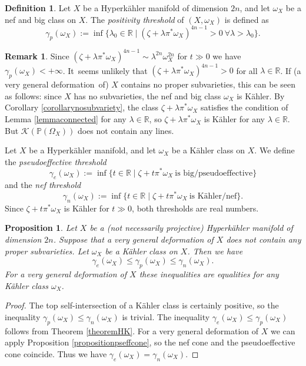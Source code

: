 \documentclass[11pt]{article}
\let\mathcal\mathscr
\theoremstyle{plain}
\newtheorem{proposition}[theorem]{Proposition}
\theoremstyle{definition}
\newtheorem{definition}[theorem]{Definition}
\newtheorem{remark}[theorem]{Remark}
\newcommand{\R}{\ensuremath{\mathbb{R}}}
\newcommand{\PP}{\ensuremath{\mathbb{P}}}
\begin{document}
\begin{definition}
Let $X$ be a Hyperkähler manifold of dimension $2n$, and
let $\omega_X$ be a nef and big class on $X$.
The \emph{positivity threshold} of $(X, \omega_X)$ is defined as
\[
\gamma_p(\omega_X):=\inf \{ \lambda_0 \in \R \mid (\zeta+ \lambda \pi^*\omega_X)^{4n-1}>0\ \forall \lambda > \lambda_0 \}.
\]
\end{definition}

\begin{remark}\label{solution}
Since $(\zeta+ \lambda\pi^*\omega_X)^{4n-1}\sim \lambda ^{2n}\omega_X^{2n}$ for $t \gg 0$
we have \hbox{$\gamma_p(\omega_X)<+\infty$}.
It~seems unlikely that $(\zeta+ \lambda \pi^*\omega_X)^{4n-1}>0$ for all $\lambda \in \R$. If
(a very general deformation~of) $X$ contains no proper subvarieties, this can be seen as follows:
since $X$ has no subvarieties, the nef and big class $\omega_X$ is Kähler.
By Corollary \ref{corollarynosubvariety}, the class $\zeta+ \lambda \pi^*\omega_X$ satisfies the condition
of Lemma \ref{lemmaconnected} for any $\lambda \in \R$, so $\zeta+ \lambda \pi^*\omega_X$ is Kähler
for any $\lambda \in \R$. But $\mathcal K(\PP(\Omega_X))$ does not contain any lines.
\end{remark}

Let $X$ be a Hyperkähler manifold, and let $\omega_X$ be a Kähler class on $X$.
We define the \emph{pseudoeffective threshold}
\[
\gamma_e(\omega_X):=\inf \{ t\in \R \mid \zeta+t\pi^*\omega_X \ \text{is big/pseudoeffective}\}
\]
and the \emph{nef threshold}
\[
\gamma_n(\omega_X):=\inf \{ t\in \R \mid \zeta+t\pi^*\omega_X \ \text{is Kähler/nef}\}.
\]
Since $\zeta+t\pi^*\omega_X$ is Kähler for $t \gg 0$, both thresholds are real numbers.

\begin{proposition}\label{threshold}
Let $X$ be a (not necessarily projective) Hyperkähler manifold of dimension $2n$.
Suppose that a very general deformation of $X$ does not contain any proper subvarieties.
Let $\omega_X$ be a Kähler class on $X$.
Then we have
\[
\gamma_e(\omega_X) \leq \gamma_p(\omega_X) \leq \gamma_n(\omega_X).
\]
For a very general deformation of $X$ these inequalities are equalities for any Kähler class $\omega_X$.
\end{proposition}

\begin{proof}
The top self-intersection of a Kähler class is certainly positive, so the inequality
$\gamma_p(\omega_X) \leq \gamma_n(\omega_X)$ is trivial.
The inequality $\gamma_e (\omega_X) \leq \gamma_p(\omega_X)$
follows from Theorem \ref{theoremHK}.
For a very general deformation of $X$ we can apply Proposition \ref{propositionpseffcone},
so the nef cone and the pseudoeffective cone coincide. Thus we have $\gamma_e(\omega_X) = \gamma_n(\omega_X)$.
\end{proof}
\end{document}
